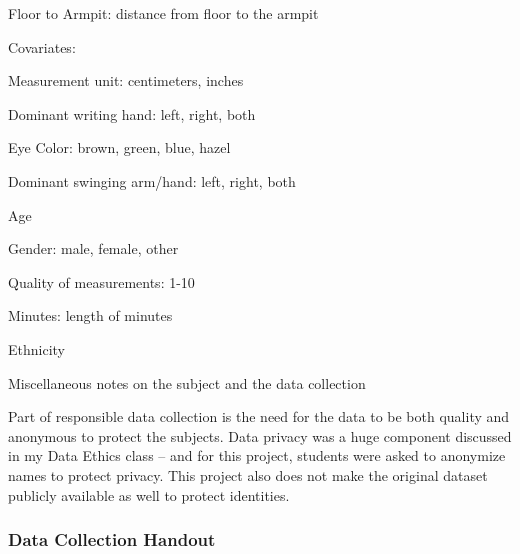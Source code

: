 \documentclass[]{article}
\begin{document}
Floor to Armpit: distance from floor to the armpit \vspace{5mm}

Covariates:

Measurement unit: centimeters, inches

Dominant writing hand: left, right, both

Eye Color: brown, green, blue, hazel

Dominant swinging arm/hand: left, right, both

Age

Gender: male, female, other

Quality of measurements: 1-10

Minutes: length of minutes

Ethnicity

Miscellaneous notes on the subject and the data collection \vspace{5mm}

Part of responsible data collection is the need for the data to be both
quality and anonymous to protect the subjects. Data privacy was a huge
component discussed in my Data Ethics class -- and for this project,
students were asked to anonymize names to protect privacy. This project
also does not make the original dataset publicly available as well to
protect identities.

\newpage
\subsubsection{Data Collection Handout}
\label{sec:appendix-data-handout}
\end{document}
